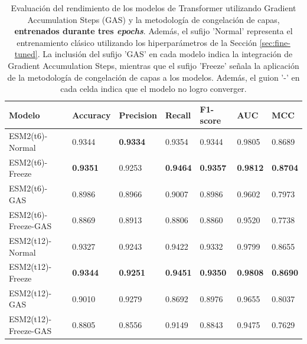 \begin{table}[h]
	\centering
	\caption[Comparación de los modelos Transformer entrenados por 3 \textit{epochs}.]{Evaluación del rendimiento de los modelos de Transformer utilizando Gradient Accumulation Steps (GAS) y la metodología de congelación de capas, \textbf{entrenados durante tres \textit{epochs}}. Además, el sufijo 'Normal' representa el entrenamiento clásico utilizando los hiperparámetros de la Sección \ref{sec:fine-tuned}. La inclusión del sufijo 'GAS' en cada modelo indica la integración de Gradient Accumulation Steps, mientras que el sufijo 'Freeze' señala la aplicación de la metodología de congelación de capas a los modelos. Además, el guion '-' en cada celda indica que el modelo no logro converger.}
	\label{tab:comparison_3_epochs}
	
	\small
	\setlength{\tabcolsep}{0.5em} %
	{\renewcommand{\arraystretch}{1.5}%
	\begin{tabular}{lllllll} 
		\textbf{Modelo}       & \textbf{Accuracy} & \textbf{Precision} & \textbf{Recall} & \textbf{F1-score} & \textbf{AUC}    & \textbf{MCC}    \\ \midrule
		ESM2(t6)-Normal             & 0.9344            & \textbf{0.9334}    & 0.9354          & 0.9344            & 0.9805          & 0.8689          \\
		ESM2(t6)-Freeze      & \textbf{0.9351}   & 0.9253             & \textbf{0.9464} & \textbf{0.9357}   & \textbf{0.9812} & \textbf{0.8704} \\
		ESM2(t6)-GAS         & 0.8986            & 0.8966             & 0.9007          & 0.8986            & 0.9602          & 0.7973          \\
		ESM2(t6)-Freeze-GAS  & 0.8869            & 0.8913             & 0.8806          & 0.8860            & 0.9520          & 0.7738          \\ \midrule
		ESM2(t12)-Normal            & 0.9327            & 0.9243             & 0.9422          & 0.9332            & 0.9799          & 0.8655          \\
		ESM2(t12)-Freeze     & \textbf{0.9344}   & \textbf{0.9251}    & \textbf{0.9451} & \textbf{0.9350}   & \textbf{0.9808} & \textbf{0.8690} \\
		ESM2(t12)-GAS        & 0.9010            & 0.9279             & 0.8692          & 0.8976            & 0.9655          & 0.8037          \\
		ESM2(t12)-Freeze-GAS & 0.8805            & 0.8556             & 0.9149          & 0.8843            & 0.9475          & 0.7629          \\ \midrule

\end{tabular}}
\end{table}
